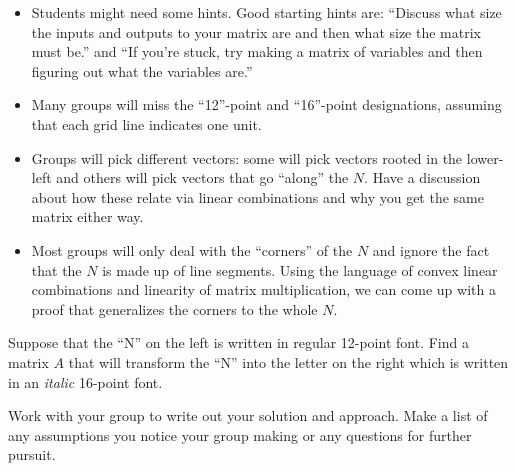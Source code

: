 \documentclass{workbook}
\begin{document}
\begin{iola}
\begin{slide}
	\begin{annotation}
		\begin{notes}
			\begin{itemize}
				\item Students might need some hints. Good starting hints are: ``Discuss
					what size the inputs and outputs to your matrix are and then what size
					the matrix must be.'' and ``If you're stuck, try making a matrix of variables
					and then figuring out what the variables are.''
				\item Many groups will miss the ``12''-point and ``16''-point designations, assuming that each
					grid line indicates one unit.
				\item Groups will pick different vectors: some will pick
					vectors rooted in the lower-left and others will pick vectors
					that go ``along'' the $N$. Have a discussion about how
					these relate via linear combinations and why you get the
					same matrix either way.
				\item Most groups will only deal with the ``corners'' of the $N$ and ignore
					the fact that the $N$ is made up of line segments. Using the language
					of convex linear combinations and linearity of matrix multiplication,
					we can come up with a proof that generalizes the corners to the whole $N$.
			\end{itemize}
		\end{notes}
	\end{annotation}

Suppose that the ``N'' on the left is written in regular 12-point font.  Find a matrix $A$ that will transform
	the ``N'' into the letter on the right which is written in an \emph{italic} 16-point font.

Work with your group to write out your solution and approach.  Make a list of any assumptions you
notice your group making or any questions for further pursuit.
\end{slide}
\end{iola}
\end{document}
